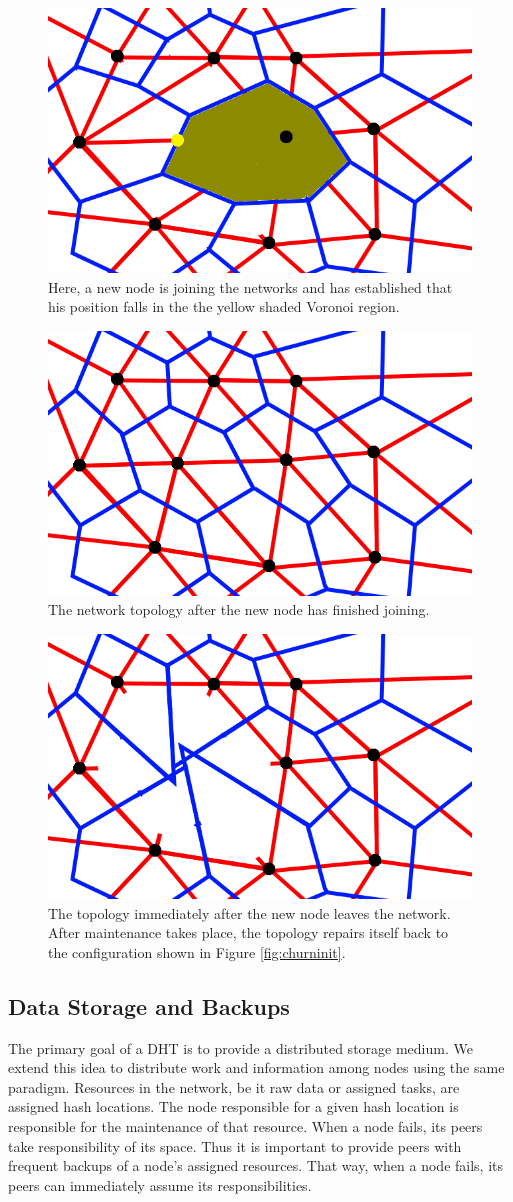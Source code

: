 \begin{figure}
	\centering
	\includegraphics[width=0.5\linewidth]{figs/voronoi-churn4}
	\caption[Topology before join]{Here, a new node is joining the networks and has established that his position falls in the the yellow shaded Voronoi region.}
	\label{fig:churnjoin}
\end{figure}


\begin{figure}
	\centering
	\includegraphics[width=0.5\linewidth]{figs/voronoi-example}
	\caption[Topology after join]{The network topology after the new node has finished joining.}
	\label{fig:churndone}
\end{figure}

\begin{figure}
	\centering
	\includegraphics[width=0.5\linewidth]{figs/voronoi-churn1}
	\caption[Topology after failure]{The topology immediately after the new node leaves the network. After maintenance takes place, the topology repairs itself back to the configuration shown in Figure \ref{fig:churninit}.}
	\label{fig:churndrop}
\end{figure}


\subsection{Data Storage and Backups}
The primary goal of a DHT is to provide a distributed storage medium. We extend this idea to distribute work and information among nodes using the same paradigm. Resources in the network, be it raw data or assigned tasks, are assigned hash locations. The node responsible for a given hash location is responsible for the maintenance of that resource. When a node fails, its peers take responsibility of its space. Thus it is important to provide peers with frequent backups of a node's assigned resources.  That way, when a node fails, its peers can immediately assume its responsibilities.

